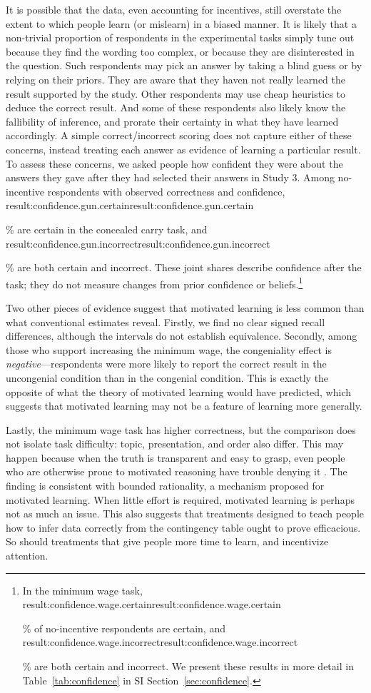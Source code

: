 \documentclass[12pt,letterpaper]{article}
\newcommand{\result}[1]{\ifcsname result:#1\endcsname\csname result:#1\endcsname\else\PackageError{replication}{Missing result #1}{}\fi}
\begin{document}
It is possible that the data, even accounting for incentives, still overstate the extent to which people learn (or mislearn) in a biased manner. It is likely that a non-trivial proportion of respondents in the experimental tasks simply tune out because they find the wording too complex, or because they are disinterested in the question. Such respondents may pick an answer by taking a blind guess or by relying on their priors. They are aware that they haven not really learned the result supported by the study. Other respondents may use cheap heuristics to deduce the correct result. And some of these respondents also likely know the fallibility of inference, and prorate their certainty in what they have learned accordingly. A simple correct/incorrect scoring does not capture either of these concerns, instead treating each answer as evidence of learning a particular result. To assess these concerns, we asked people how confident they were about the answers they gave after they had selected their answers in Study 3. Among no-incentive respondents with observed correctness and confidence, \result{confidence.gun.certain}\% are certain in the concealed carry task, and \result{confidence.gun.incorrect}\% are both certain and incorrect. These joint shares describe confidence after the task; they do not measure changes from prior confidence or beliefs.\footnote{In the minimum wage task, \result{confidence.wage.certain}\% of no-incentive respondents are certain, and \result{confidence.wage.incorrect}\% are both certain and incorrect. We present these results in more detail in Table~\ref{tab:confidence} in SI Section~\ref{sec:confidence}.}

Two other pieces of evidence suggest that motivated learning is less common than what conventional estimates reveal. Firstly, we find no clear signed recall differences, although the intervals do not establish equivalence. Secondly, among those who support increasing the minimum wage, the congeniality effect is \textit{negative}---respondents were more likely to report the correct result in the uncongenial condition than in the congenial condition. This is exactly the opposite of what the theory of motivated learning would have predicted, which suggests that motivated learning may not be a feature of learning more generally.

Lastly, the minimum wage task has higher correctness, but the comparison does not isolate task difficulty: topic, presentation, and order also differ. This may happen because when the truth is transparent and easy to grasp, even people who are otherwise prone to motivated reasoning have trouble denying it \citep[see also][who shows that when economic conditions are unambiguous, as in the 2008 recession, factual beliefs about the economy converge]{bisgaard2015}. The finding is consistent with bounded rationality, a mechanism proposed for motivated learning. When little effort is required, motivated learning is perhaps not as much an issue. This also suggests that treatments designed to teach people how to infer data correctly from the contingency table ought to prove efficacious. So should treatments that give people more time to learn, and incentivize attention.
\end{document}
